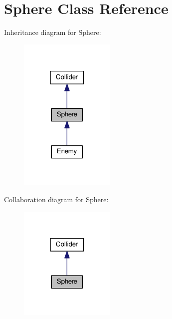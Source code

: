 \hypertarget{class_sphere}{}\section{Sphere Class Reference}
\label{class_sphere}


Inheritance diagram for Sphere\+:\nopagebreak
\begin{figure}[H]
\begin{center}
\leavevmode
\includegraphics[width=130pt]{class_sphere__inherit__graph}
\end{center}
\end{figure}


Collaboration diagram for Sphere\+:\nopagebreak
\begin{figure}[H]
\begin{center}
\leavevmode
\includegraphics[width=130pt]{class_sphere__coll__graph}
\end{center}
\end{figure}
